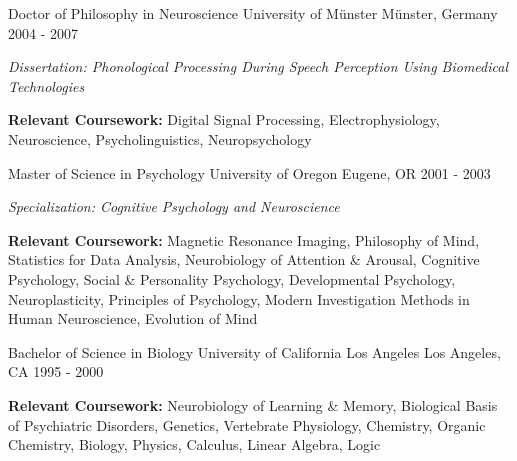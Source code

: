 

\begin{cventries}

  \cventry
    {Doctor of Philosophy in Neuroscience} %
    {University of Münster} %
    {Münster, Germany} %
    {2004 - 2007} %
    {
      \begin{cvitems} %
        \item {\textit{Dissertation: Phonological Processing During Speech Perception Using Biomedical Technologies}}
        \item {\textbf{Relevant Coursework:} Digital Signal Processing, Electrophysiology, Neuroscience, Psycholinguistics, Neuropsychology}
      \end{cvitems}
    }

  \cventry
    {Master of Science in Psychology} %
    {University of Oregon} %
    {Eugene, OR} %
    {2001 - 2003} %
    {
      \begin{cvitems} %
        \item {\textit{Specialization: Cognitive Psychology and Neuroscience}}
        \item {\textbf{Relevant Coursework:} Magnetic Resonance Imaging, Philosophy of Mind, Statistics for Data Analysis, Neurobiology of Attention \& Arousal, Cognitive Psychology, Social \& Personality Psychology, Developmental Psychology, Neuroplasticity, Principles of Psychology, Modern Investigation Methods in Human Neuroscience, Evolution of Mind}
      \end{cvitems}
    }

  \cventry
    {Bachelor of Science in Biology} %
    {University of California Los Angeles} %
    {Los Angeles, CA} %
    {1995 - 2000} %
    {
      \begin{cvitems} %
        \item {\textbf{Relevant Coursework:} Neurobiology of Learning \& Memory, Biological Basis of Psychiatric Disorders, Genetics, Vertebrate Physiology, Chemistry, Organic Chemistry, Biology, Physics, Calculus, Linear Algebra, Logic}
      \end{cvitems}
    }
\end{cventries}
